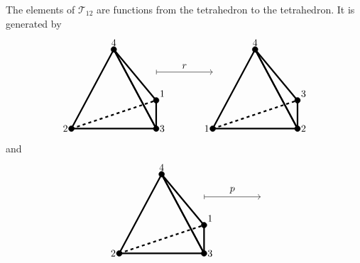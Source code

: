 \documentclass{ximera}
\begin{document}
\begin{example}\label{EG:T12-A4}
  The elements of $\mathcal{T}_{12}$ are functions from the
  tetrahedron to the tetrahedron. It is generated by
  \[
\begin{tikzpicture}
  \draw[ultra thick,rounded corners=.05mm] (0,0) -- (3,0) -- (1.5,2.8) -- cycle;
  \draw[ultra thick,rounded corners=.05mm] (3,1) -- (3,0) -- (1.5,2.8) -- cycle;
  \draw[ultra thick,dashed] (0,0) -- (3,1);
  \draw[fill] (3,1) circle (1mm) node[above right] {$1$};
  \draw[fill] (0,0) circle (1mm) node[left] {$2$};
  \draw[fill] (3,0) circle (1mm) node[right] {$3$};
  \draw[fill] (1.5,2.8) circle (1mm) node[above] {$4$};

  \draw[|->] (3,2) -- (5,2);
  \node[above] at (4,2) {$r$};
  
  \draw[ultra thick,rounded corners=.05mm] (5,0) -- (8,0) -- (6.5,2.8) -- cycle;
  \draw[ultra thick,rounded corners=.05mm] (8,1) -- (8,0) -- (6.5,2.8) -- cycle;
  \draw[ultra thick,dashed] (5,0) -- (8,1);
  \draw[fill] (8,1) circle (1mm) node[above right] {$3$};
  \draw[fill] (5,0) circle (1mm) node[left] {$1$};
  \draw[fill] (8,0) circle (1mm) node[right] {$2$};
  \draw[fill] (6.5,2.8) circle (1mm) node[above] {$4$};
\end{tikzpicture}
\]
and
\[
\begin{tikzpicture}
  \draw[ultra thick,rounded corners=.05mm] (0,0) -- (3,0) -- (1.5,2.8) -- cycle;
  \draw[ultra thick,rounded corners=.05mm] (3,1) -- (3,0) -- (1.5,2.8) -- cycle;
  \draw[ultra thick,dashed] (0,0) -- (3,1);
  \draw[fill] (3,1) circle (1mm) node[above right] {$1$};
  \draw[fill] (0,0) circle (1mm) node[left] {$2$};
  \draw[fill] (3,0) circle (1mm) node[right] {$3$};
  \draw[fill] (1.5,2.8) circle (1mm) node[above] {$4$};

  \draw[|->] (3,2) -- (5,2);
  \node[above] at (4,2) {$p$};
  

\end{tikzpicture}\]
\end{example}
\end{document}
